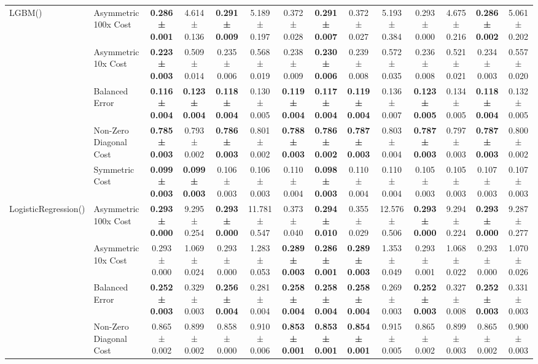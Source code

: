 \begin{table}[H]
{\begin{tabular}{llcccccccccccc}
\cline{1-14}
\multirow[t]{5}{*}{LGBM()} & Asymmetric 100x Cost & \textbf{0.286 ± 0.001} & 4.614 ± 0.136 & \textbf{0.291 ± 0.009} & 5.189 ± 0.197 & 0.372 ± 0.028 & \textbf{0.291 ± 0.007} & 0.372 ± 0.027 & 5.193 ± 0.384 & 0.293 ± 0.000 & 4.675 ± 0.216 & \textbf{0.286 ± 0.002} & 5.061 ± 0.202 \\
 & Asymmetric 10x Cost & \textbf{0.223 ± 0.003} & 0.509 ± 0.014 & 0.235 ± 0.006 & 0.568 ± 0.019 & 0.238 ± 0.009 & \textbf{0.230 ± 0.006} & 0.239 ± 0.008 & 0.572 ± 0.035 & 0.236 ± 0.008 & 0.521 ± 0.021 & 0.234 ± 0.003 & 0.557 ± 0.020 \\
 & Balanced Error & \textbf{0.116 ± 0.004} & \textbf{0.123 ± 0.004} & \textbf{0.118 ± 0.004} & 0.130 ± 0.005 & \textbf{0.119 ± 0.004} & \textbf{0.117 ± 0.004} & \textbf{0.119 ± 0.004} & 0.136 ± 0.007 & \textbf{0.123 ± 0.005} & 0.134 ± 0.005 & \textbf{0.118 ± 0.004} & 0.132 ± 0.005 \\
 & Non-Zero Diagonal Cost & \textbf{0.785 ± 0.003} & 0.793 ± 0.002 & \textbf{0.786 ± 0.003} & 0.801 ± 0.002 & \textbf{0.788 ± 0.003} & \textbf{0.786 ± 0.002} & \textbf{0.787 ± 0.003} & 0.803 ± 0.004 & \textbf{0.787 ± 0.003} & 0.797 ± 0.003 & \textbf{0.787 ± 0.003} & 0.800 ± 0.002 \\
 & Symmetric Cost & \textbf{0.099 ± 0.003} & \textbf{0.099 ± 0.003} & 0.106 ± 0.003 & 0.106 ± 0.003 & 0.110 ± 0.004 & \textbf{0.098 ± 0.003} & 0.110 ± 0.004 & 0.110 ± 0.004 & 0.105 ± 0.003 & 0.105 ± 0.003 & 0.107 ± 0.003 & 0.107 ± 0.003 \\
\cline{1-14}
\multirow[t]{5}{*}{LogisticRegression()} & Asymmetric 100x Cost & \textbf{0.293 ± 0.000} & 9.295 ± 0.254 & \textbf{0.293 ± 0.000} & 11.781 ± 0.547 & 0.373 ± 0.040 & \textbf{0.294 ± 0.010} & 0.355 ± 0.029 & 12.576 ± 0.506 & \textbf{0.293 ± 0.000} & 9.294 ± 0.224 & \textbf{0.293 ± 0.000} & 9.287 ± 0.277 \\
 & Asymmetric 10x Cost & 0.293 ± 0.000 & 1.069 ± 0.024 & 0.293 ± 0.000 & 1.283 ± 0.053 & \textbf{0.289 ± 0.003} & \textbf{0.286 ± 0.001} & \textbf{0.289 ± 0.003} & 1.353 ± 0.049 & 0.293 ± 0.001 & 1.068 ± 0.022 & 0.293 ± 0.000 & 1.070 ± 0.026 \\
 & Balanced Error & \textbf{0.252 ± 0.003} & 0.329 ± 0.003 & \textbf{0.256 ± 0.004} & 0.281 ± 0.004 & \textbf{0.258 ± 0.004} & \textbf{0.258 ± 0.004} & \textbf{0.258 ± 0.004} & 0.269 ± 0.003 & \textbf{0.252 ± 0.003} & 0.327 ± 0.008 & \textbf{0.252 ± 0.003} & 0.331 ± 0.003 \\
 & Non-Zero Diagonal Cost & 0.865 ± 0.002 & 0.899 ± 0.002 & 0.858 ± 0.000 & 0.910 ± 0.006 & \textbf{0.853 ± 0.001} & \textbf{0.853 ± 0.001} & \textbf{0.854 ± 0.001} & 0.915 ± 0.005 & 0.865 ± 0.002 & 0.899 ± 0.003 & 0.865 ± 0.002 & 0.900 ± 0.003 \\

\end{tabular}}
\end{table}
